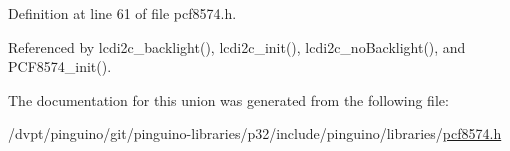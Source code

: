Definition at line 61 of file pcf8574.\-h.



Referenced by lcdi2c\-\_\-backlight(), lcdi2c\-\_\-init(), lcdi2c\-\_\-no\-Backlight(), and P\-C\-F8574\-\_\-init().



The documentation for this union was generated from the following file\-:\begin{DoxyCompactItemize}
\item 
/dvpt/pinguino/git/pinguino-\/libraries/p32/include/pinguino/libraries/\hyperlink{p32_2include_2pinguino_2libraries_2pcf8574_8h}{pcf8574.\-h}\end{DoxyCompactItemize}
